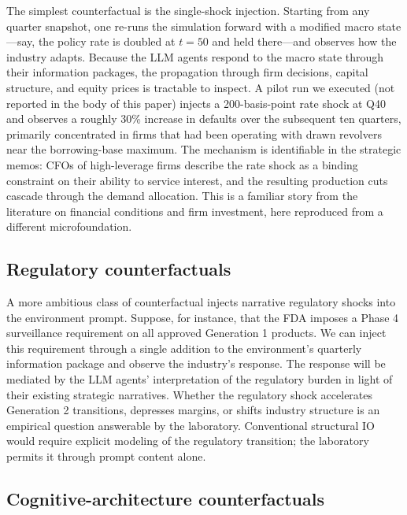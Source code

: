 \documentclass[11pt]{article}
\begin{document}
The simplest counterfactual is the single-shock injection. Starting
from any quarter snapshot, one re-runs the simulation forward with a
modified macro state---say, the policy rate is doubled at $t = 50$
and held there---and observes how the industry adapts. Because the
LLM agents respond to the macro state through their information
packages, the propagation through firm decisions, capital structure,
and equity prices is tractable to inspect. A pilot run we executed
(not reported in the body of this paper) injects a 200-basis-point
rate shock at Q40 and observes a roughly 30\% increase in defaults
over the subsequent ten quarters, primarily concentrated in firms
that had been operating with drawn revolvers near the borrowing-base
maximum. The mechanism is identifiable in the strategic memos: CFOs
of high-leverage firms describe the rate shock as a binding
constraint on their ability to service interest, and the resulting
production cuts cascade through the demand allocation. This is a
familiar story from the \citet{ottonello2020financial} literature on
financial conditions and firm investment, here reproduced from a
different microfoundation.

\subsection{Regulatory counterfactuals}

A more ambitious class of counterfactual injects narrative
regulatory shocks into the environment prompt. Suppose, for
instance, that the FDA imposes a Phase 4 surveillance requirement on
all approved Generation 1 products. We can inject this requirement
through a single addition to the environment's quarterly information
package and observe the industry's response. The response will be
mediated by the LLM agents' interpretation of the regulatory burden
in light of their existing strategic narratives. Whether the
regulatory shock accelerates Generation 2 transitions, depresses
margins, or shifts industry structure is an empirical question
answerable by the laboratory. Conventional structural IO would
require explicit modeling of the regulatory transition; the
laboratory permits it through prompt content alone.

\subsection{Cognitive-architecture counterfactuals}
\end{document}
